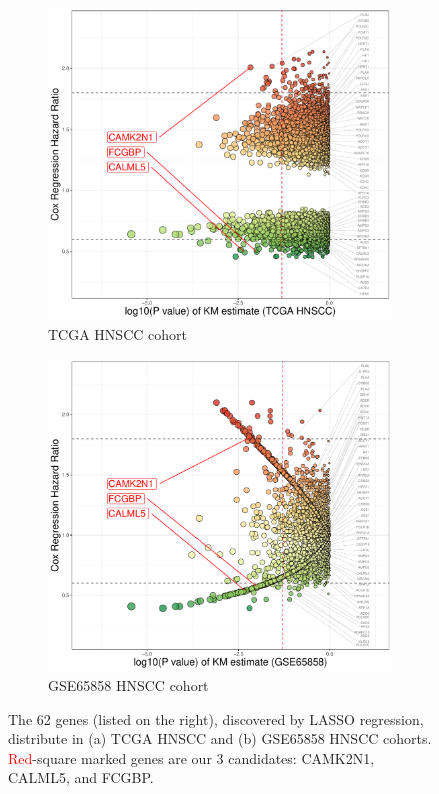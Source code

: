 \documentclass[preprint,12pt]{elsarticle}
\newenvironment{MyColorPar}[1]{%
    \leavevmode\color{#1}\ignorespaces%
}{%
}%
\begin{document}
\begin{MyColorPar}{blue}
\begin{figure}[!tbp]
  \begin{subfigure}[b]{0.5\textwidth}
        \includegraphics[width=\textwidth]{Rplot_TCGA_HNSCC_CoxHR_CAMK2N1_Bayes62_FDRKM.pdf}
        \caption{TCGA HNSCC cohort}
  \end{subfigure}
  \hfill
  \begin{subfigure}[b]{0.5\textwidth}
       \includegraphics[width=\textwidth]{Rplot_GSE65858_HNSCC_CoxHR_CAMK2N1_Bayes62_FDRKM.pdf} 
       \caption{GSE65858 HNSCC cohort}
  \end{subfigure}
  \caption{The 62 genes (listed on the right), discovered by LASSO regression, distribute in (a) TCGA HNSCC and (b) GSE65858 HNSCC cohorts. \textcolor{red}{Red}-square marked genes are our 3 candidates: CAMK2N1, CALML5, and FCGBP.}
  \label{fig:Bayes62}
\end{figure}


\end{MyColorPar}
\end{document}
